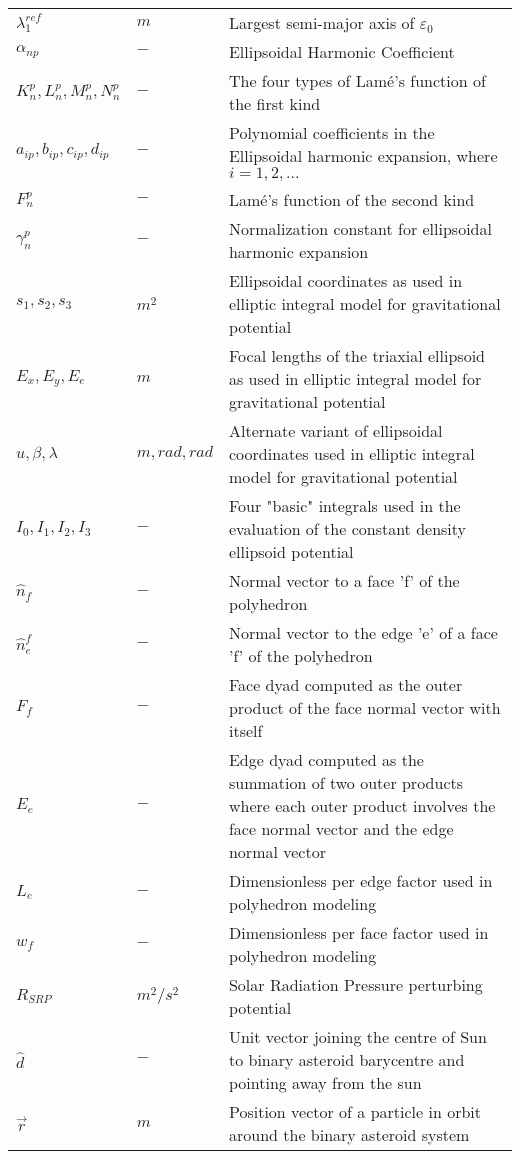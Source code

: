 \begin{longtable}[l]{p{100pt} p{70pt} p{250pt}}
$\lambda_1^{ref}$		& $m$		& Largest semi-major axis of $\varepsilon_0$\\
$\alpha_{np}$		& $-$		& Ellipsoidal Harmonic Coefficient\\
$K_n^p, L_n^p, M_n^p, N_n^p$	& $-$		& The four types of Lam\' e's function of the first kind\\
$a_{ip}, b_{ip}, c_{ip}, d_{ip}$ 	& $-$	& Polynomial coefficients in the Ellipsoidal harmonic expansion, where $i=1,2,...$\\
$F_n^p$		& $-$		& Lam\' e's function of the second kind\\
$\gamma_n^p$		& $-$		& Normalization constant for ellipsoidal harmonic expansion\\
$s_1, s_2, s_3$		& $m^2$		& Ellipsoidal coordinates as used in elliptic integral model for gravitational potential\\ 
$E_x, E_y, E_e$		& $m$		& Focal lengths of the triaxial ellipsoid as used in elliptic integral model for gravitational potential\\
$u, \beta, \lambda$		& $m,rad,rad$		& Alternate variant of ellipsoidal coordinates used in elliptic integral model for gravitational potential\\
$I_0, I_1, I_2, I_3$	& $-$		& Four "basic" integrals used in the evaluation of the constant density ellipsoid potential\\
$\hat{n}_f$		& $-$		& Normal vector to a face 'f' of the polyhedron\\
$\hat{n}_e^f$		& $-$	& Normal vector to the edge 'e' of a face 'f' of the polyhedron\\
$F_f$		& $-$		& Face dyad computed as the outer product of the face normal vector with itself\\
$E_e$		& $-$		& Edge dyad computed as the summation of two outer products where each outer product involves the face normal vector and the edge normal vector\\
$L_e$			& $-$		& Dimensionless per edge factor used in polyhedron modeling\\
$w_f$		& $-$		& Dimensionless per face factor used in polyhedron modeling\\
$R_{SRP}$	& $m^2/s^2$		& Solar Radiation Pressure perturbing potential\\
$\hat{d}$		& $-$	& Unit vector joining the centre of Sun to binary asteroid barycentre and pointing away from the sun\\
$\overrightarrow{r}$	& $m$ 	& Position vector of a particle in orbit around the binary asteroid system\\

\end{longtable}
